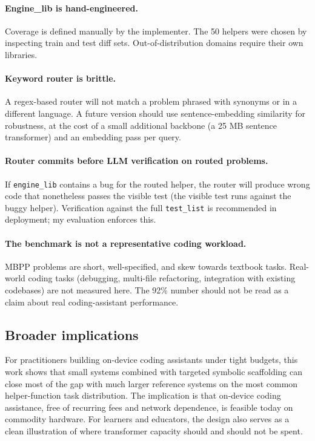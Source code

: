 \documentclass[11pt,a4paper]{article}
\begin{document}
\paragraph{Engine\_lib is hand-engineered.}
Coverage is defined manually by the implementer. The 50 helpers were chosen by inspecting train and test diff sets. Out-of-distribution domains require their own libraries.

\paragraph{Keyword router is brittle.}
A regex-based router will not match a problem phrased with synonyms or in a different language. A future version should use sentence-embedding similarity for robustness, at the cost of a small additional backbone (a 25 MB sentence transformer) and an embedding pass per query.

\paragraph{Router commits before LLM verification on routed problems.}
If \texttt{engine\_lib} contains a bug for the routed helper, the router will produce wrong code that nonetheless passes the visible test (the visible test runs against the buggy helper). Verification against the full \texttt{test\_list} is recommended in deployment; my evaluation enforces this.

\paragraph{The benchmark is not a representative coding workload.}
MBPP problems are short, well-specified, and skew towards textbook tasks. Real-world coding tasks (debugging, multi-file refactoring, integration with existing codebases) are not measured here. The 92\% number should not be read as a claim about real coding-assistant performance.

\subsection{Broader implications}

For practitioners building on-device coding assistants under tight budgets, this work shows that small systems combined with targeted symbolic scaffolding can close most of the gap with much larger reference systems on the most common helper-function task distribution. The implication is that on-device coding assistance, free of recurring fees and network dependence, is feasible today on commodity hardware. For learners and educators, the design also serves as a clean illustration of where transformer capacity should and should not be spent.
\end{document}

